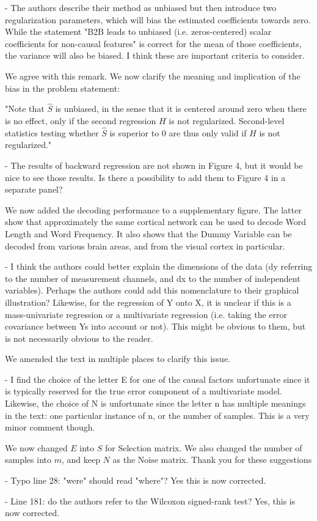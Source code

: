 - The authors describe their method as unbiased but then introduce two
    regularization parameters, which will bias the estimated coefficients towards
    zero. While the statement "B2B leads to unbiased (i.e. zeros-centered) scalar
    coefficients for non-causal features" is correct for the mean of those
    coefficients, the variance will also be biased. I think these are important
    criteria to consider.

We agree with this remark. We now clarify the meaning and implication of the
bias in the problem statement:

"Note that $\hat S$ is unbiased, in the sense that it is centered around zero when there is no
effect, only if the second regression $H$ is not regularized. Second-level
statistics testing whether $\hat S$ is superior to 0 are thus only valid if $H$
is not regularized."

- The results of backward regression are not shown in Figure 4, but it would be
    nice to see those results. Is there a possibility to add them to Figure 4 in a
    separate panel?

We now added the decoding performance to a supplementary figure. The latter show
that approximately the same cortical network can be used to decode Word Length
and Word Frequency. It also shows that the Dummy Variable can be decoded from
various brain areas, and from the visual cortex in particular.

- I think the authors could better explain the dimensions of the data (dy
    referring to the number of measurement channels, and dx to the number of
    independent variables). Perhaps the authors could add this nomenclature to their
    graphical illustration? Likewise, for the regression of Y onto X, it is unclear
    if this is a mass-univariate regression or a multivariate regression (i.e.
    taking the error covariance between Ys into account or not). This might be
    obvious to them, but is not necessarily obvious to the reader.

We amended the text in multiple places to clarify this issue.

- I find the choice of the letter E for one of the causal factors unfortunate
    since it is typically reserved for the true error component of a multivariate
    model. Likewise, the choice of N is unfortunate since the letter n has multiple
    meanings in the text: one particular instance of n, or the number of samples.
    This is a very minor comment though.

We now changed $E$ into $S$ for Selection matrix. We also changed the number of
samples into $m$, and keep $N$ as the Noise matrix. Thank you for these suggestions

- Typo line 28: "were" should read "where"?
Yes this is now corrected.

- Line 181: do the authors refer to the Wilcoxon signed-rank test?
Yes, this is now corrected.